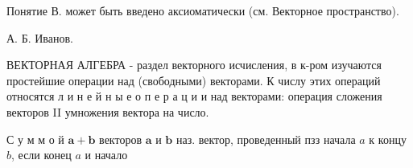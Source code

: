 \documentclass[10pt]{article}
\begin{document}
Понятие В. может быть введено аксиоматически (см. Векторное пространство).



А. Б. Иванов.



ВЕКТОРНАЯ АЛГЕБРА - раздел векторного исчисления, в к-ром изучаются простейшие операции над (свободными) векторами. К числу этих операций относятся л и н е й н ы е о п е р а ц и и над векторами: операция сложения векторов II умножения вектора на число.



С у м м о й $\boldsymbol{a}+\boldsymbol{b}$ векторов $\boldsymbol{a}$ и $\boldsymbol{b}$ наз. вектор, проведенный пзз начала $a$ к концу $b$, если конец $a$ и начало
\end{document}
